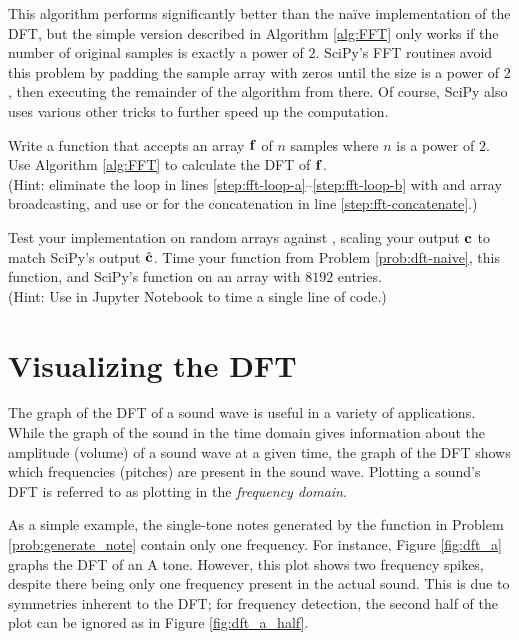 This algorithm performs significantly better than the na\"ive implementation of the DFT, but the simple version described in Algorithm \ref{alg:FFT} only works if the number of original samples is exactly a power of $2$.
SciPy's FFT routines avoid this problem by padding the sample array with zeros until the size is a power of $2$, then executing the remainder of the algorithm from there. %
Of course, SciPy also uses various other tricks to further speed up the computation.

\begin{problem} %
Write a function that accepts an array $\mathbf{f}$ of $n$ samples where $n$ is a power of $2$.
Use Algorithm \ref{alg:FFT} to calculate the DFT of $\mathbf{f}$.
\\(Hint: eliminate the loop in lines \ref{step:fft-loop-a}--\ref{step:fft-loop-b} with  and array broadcasting, and use  or  for the concatenation in line \ref{step:fft-concatenate}.)

Test your implementation on random arrays against , scaling your output $\mathbf{c}$ to match SciPy's output $\hat{\mathbf{c}}$.
Time your function from Problem \ref{prob:dft-naive}, this function, and SciPy's function on an array with $8192$ entries.
\\(Hint: Use  in Jupyter Notebook to time a single line of code.)
\label{prob:fft-simple}
\end{problem}

\section*{Visualizing the DFT} %

The graph of the DFT of a sound wave is useful in a variety of applications.
While the graph of the sound in the time domain gives information about the amplitude (volume) of a sound wave at a given time, the graph of the DFT shows which frequencies (pitches) are present in the sound wave.
Plotting a sound's DFT is referred to as plotting in the \emph{frequency domain}.

As a simple example, the single-tone notes generated by the function in Problem \ref{prob:generate_note} contain only one frequency.
For instance, Figure \ref{fig:dft_a} graphs the DFT of an A tone.
However, this plot shows two frequency spikes, despite there being only one frequency present in the actual sound.
This is due to symmetries inherent to the DFT; for frequency detection, the second half of the plot can be ignored as in Figure \ref{fig:dft_a_half}.

